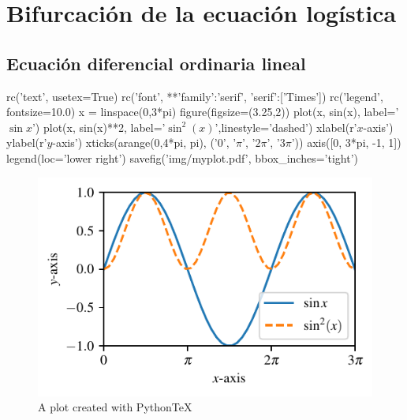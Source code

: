 \chapter{Bifurcación de la ecuación logística}
\section{Ecuación diferencial ordinaria lineal}

\begin{pylabcode}[plotsession]
rc('text', usetex=True)
rc('font', **{'family':'serif', 'serif':['Times']})
rc('legend', fontsize=10.0)
x = linspace(0,3*pi)
figure(figsize=(3.25,2))
plot(x, sin(x), label='$\sin x$')
plot(x, sin(x)**2, label='$\sin^{2}(x)$',linestyle='dashed')
xlabel(r'$x$-axis')
ylabel(r'$y$-axis')
xticks(arange(0,4*pi, pi), ('$0$', '$\pi$', '$2\pi$', '$3\pi$'))
axis([0, 3*pi, -1, 1])
legend(loc='lower right')
savefig('img/myplot.pdf', bbox_inches='tight')
\end{pylabcode}

\begin{figure}[t]
	\sidecaption[t]
	\includegraphics[scale=.65]{./img/myplot}
	\caption{\label{fig:matlpotlib} A plot created with PythonTeX}
\end{figure}